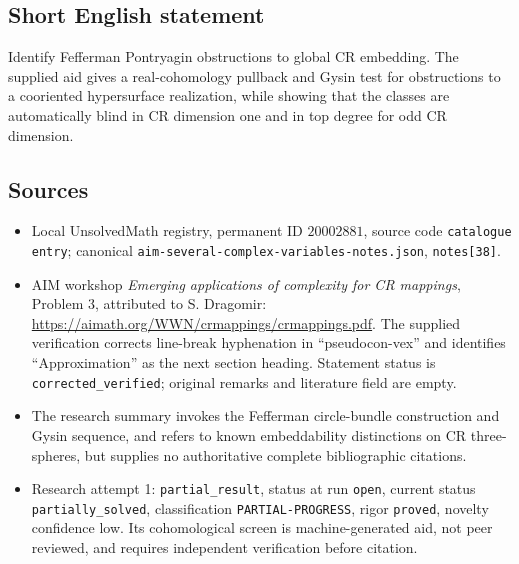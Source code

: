 \documentclass[11pt]{article}
\begin{document}
\subsection{Short English statement}
Identify Fefferman Pontryagin obstructions to global CR embedding. The supplied aid gives a real-cohomology pullback and Gysin test for obstructions to a cooriented hypersurface realization, while showing that the classes are automatically blind in CR dimension one and in top degree for odd CR dimension.
\subsection{Sources}
\begin{itemize}
\item Local UnsolvedMath registry, permanent ID $20002881$, source code \texttt{catalogue entry}; canonical \texttt{aim-several-complex-variables-notes.json}, \texttt{notes[38]}.
\item AIM workshop \emph{Emerging applications of complexity for CR mappings}, Problem 3, attributed to S. Dragomir: \url{https://aimath.org/WWN/crmappings/crmappings.pdf}. The supplied verification corrects line-break hyphenation in ``pseudocon-vex'' and identifies ``Approximation'' as the next section heading. Statement status is \texttt{corrected\_verified}; original remarks and literature field are empty.
\item The research summary invokes the Fefferman circle-bundle construction and Gysin sequence, and refers to known embeddability distinctions on CR three-spheres, but supplies no authoritative complete bibliographic citations.
\item Research attempt 1: \texttt{partial\_result}, status at run \texttt{open}, current status \texttt{partially\_solved}, classification \texttt{PARTIAL-PROGRESS}, rigor \texttt{proved}, novelty confidence low. Its cohomological screen is machine-generated aid, not peer reviewed, and requires independent verification before citation.
\end{itemize}
\end{document}
